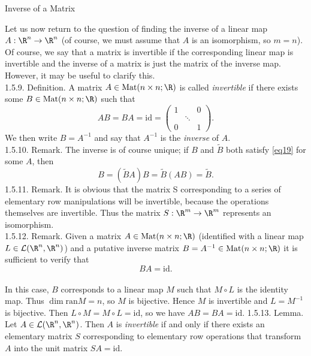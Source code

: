 \documentclass[smaller,hyperref={CJKbookmarks=true}]{beamer}
\begin{document}
\begin{frame}{Inverse of a Matrix}
\begin{spacing}{1}
Let us now return to the question of finding the inverse of a linear map $A:\R^n\to\R^n$ (of course, we must assume that $A$ is an isomorphism, so
$m = n$). Of course, we say that a matrix is invertible if the corresponding
linear map is invertible and the inverse of a matrix is just the matrix of the inverse map. However, it may be useful to clarify this.\\
\alert{1.5.9. Definition.} A matrix $A\in\text{Mat}(n\times n;\R)$ is called \emph{invertible} if there exists some $B\in\text{Mat}(n\times n;\R)$ such that
\begin{equation}\label{eq19}
  AB=BA=\text{id}=\begin{pmatrix}
                    1 &  & 0 \\
                      & \ddots &  \\
                    0 &  & 1
                  \end{pmatrix}.
\end{equation}
We then write $B=A^{-1}$ and say that $A^{-1}$ is the \emph{inverse} of $A$.\\
\alert{1.5.10. Remark.} The inverse is of course unique; if $B$ and $\widetilde{B}$ both satisfy \eqref{eq19} for some $A$, then
\[B=(\widetilde{B}A)B=\widetilde{B}(AB)=\widetilde{B}.\]
\newpage
\alert{1.5.11. Remark.} It is obvious that the matrix S corresponding to a series of
elementary row manipulations will be invertible, because the operations
themselves are invertible. Thus the matrix $S:\R^m\to\R^m$ represents an isomorphism.\\[9pt]
\alert{1.5.12. Remark.} Given a matrix $A\in\text{Mat}(n\times n;\R)$ (identified with a linear map $L\in\mathcal{L}(\R^n,\R^n)$) and a putative inverse matrix $B=A^{-1}\in\text{Mat}(n\times n;\R)$ it is suf{}ficient to verify that\\[5pt]
\[BA=\text{id}.\]
 \\[5pt]
In this case, $B$ corresponds to a linear map $M$ such that $M\circ L$ is the identity map. Thus $\dim\text{ran}M=n$, so $M$ is bijective. Hence $M$ is invertible and $L=M^{-1}$ is bijective. Then $L\circ M=M\circ L=\text{id}$, so we have $AB=BA=\text{id}$.
\newpage
\alert{1.5.13. Lemma.} Let $A\in\mathcal{L}(\R^n,\R^n)$. Then $A$ is \emph{invertible} if and only if there exists an elementary matrix $S$ corresponding to elementary row operations that transform $A$ into the unit matrix $SA = \text{id}$.\\[8pt]

\end{spacing}
\end{frame}
\end{document}
